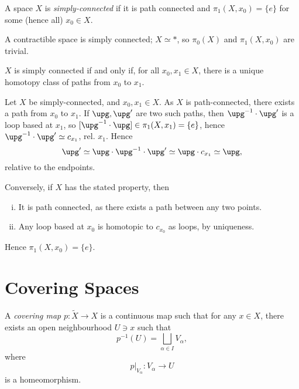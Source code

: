 \documentclass[12pt]{article}
\begin{document}
\begin{definition}
	A space $X$ is \emph{simply-connected} if it is path connected and $\pi_1(X, x_0) = \{e\}$ for some (hence all) $x_0 \in X$.
\end{definition}

\begin{exbox}
	A contractible space is simply connected; $X \simeq \ast$, so $\pi_0(X)$ and $\pi_1(X, x_0)$ are trivial.
\end{exbox}

\begin{lemma}
	$X$ is simply connected if and only if, for all $x_0, x_1 \in X$, there is a unique homotopy class of paths from $x_0$ to $x_1$.
\end{lemma}

\begin{proofbox}
	Let $X$ be simply-connected, and $x_0, x_1 \in X$. As $X$ is path-connected, there exists a path from $x_0$ to $x_1$. If $\upg, \upg'$ are two such paths, then $\upg^{-1} \cdot \upg'$ is a loop based at $x_1$, so $[\upg^{-1} \cdot \upg] \in \pi_1(X, x_1) = \{e\}$, hence $\upg^{-1} \cdot \upg' \simeq c_{x_1}$, rel. $x_1$. Hence 
	\[
	\upg' \simeq \upg \cdot \upg^{-1} \cdot \upg' \simeq \upg \cdot c_{x_1} \simeq \upg,
	\]
	relative to the endpoints.

	Conversely, if $X$ has the stated property, then
	\begin{enumerate}[(i)]
		\item It is path connected, as there exists a path between any two points.
		\item Any loop based at $x_0$ is homotopic to $c_{x_0}$ as loops, by uniqueness.
	\end{enumerate}
	Hence $\pi_1(X, x_0) = \{e\}$.
\end{proofbox}

\newpage

\section{Covering Spaces}
\label{sec:cov_spac}

\begin{definition}
	A \emph{covering map} $p : \tilde X \to X$ is a continuous map such that for any $x \in X$, there exists an open neighbourhood $U \ni x$ such that
	\[
	p^{-1}(U) = \bigsqcup_{\alpha \in I} V_\alpha,
	\]
	where
	\[
	p|_{V_\alpha} : V_{\alpha} \to U
	\]
	is a homeomorphism.
\end{definition}
\end{document}
